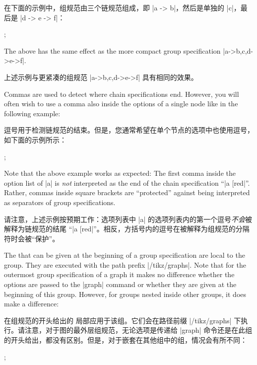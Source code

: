 在下面的示例中，组规范由三个链规范组成，即 |a -> b|，然后是单独的 |c|，最后是 |d -> e -> f|：

%
\begin{codeexample}[preamble={\usetikzlibrary{graphs}}]
\tikz {};
\end{codeexample}
%
The above has the same effect as the more compact group specification
|{a->b,c,d->e->f}|.

上述示例与更紧凑的组规范 |{a->b,c,d->e->f}| 具有相同的效果。

Commas are used to detect where chain specifications end. However, you will
often wish to use a comma also inside the options of a single node like in the
following example:

逗号用于检测链规范的结束。但是，您通常希望在单个节点的选项中也使用逗号，如下面的示例所示：

%
\begin{codeexample}[preamble={\usetikzlibrary{graphs}}]
\tikz {};
\end{codeexample}

Note that the above example works as expected: The first comma inside the
option list of |a| is \emph{not} interpreted as the end of the chain
specification ``|a [red|''. Rather, commas inside square brackets are
``protected'' against being interpreted as separators of group specifications.

请注意，上述示例按预期工作：选项列表中 |a| 的选项列表内的第一个逗号\emph{不会}被解释为链规范的结尾 ``|a [red|''。相反，方括号内的逗号在被解释为组规范的分隔符时会被“保护”。

The  that can be given at the beginning of a group specification
are local to the group. They are executed with the path prefix |/tikz/graphs|.
Note that for the outermost group specification of a graph it makes no
difference whether the options are passed to the |graph| command or whether
they are given at the beginning of this group. However, for groups nested
inside other groups, it does make a difference:

在组规范的开头给出的  局部应用于该组。它们会在路径前缀 |/tikz/graphs| 下执行。请注意，对于图的最外层组规范，无论选项是传递给 |graph| 命令还是在此组的开头给出，都没有区别。但是，对于嵌套在其他组中的组，情况会有所不同：

%
\begin{codeexample}[preamble={\usetikzlibrary{graphs}}]
\tikz {};
\end{codeexample}

